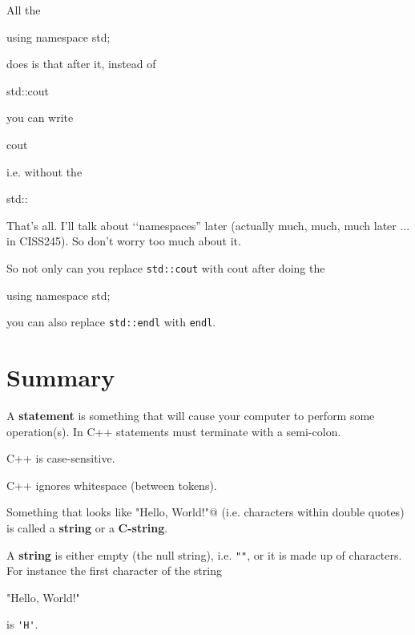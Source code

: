 All the 
\begin{console}[frame=none]

        using namespace std;

\end{console}
does is that after it, instead of
\begin{console}[frame=none]

        std::cout

\end{console}
you can write
\begin{console}[frame=none]

        cout

\end{console}
i.e. without the 
\begin{console}[frame=none]

	std::

\end{console}
That's all. I'll talk about 
\lq\lq namespaces'' later 
(actually much, much, much later ... in CISS245). 
So don't worry too much about it. 




So not only can you replace \verb!std::cout! with cout after doing the 
\begin{console}[frame=none]

    using namespace std;

\end{console}
you can also replace \verb!std::endl! with \verb!endl!.





\newpage\section{Summary}

A \textbf{statement} 
is something that will cause your computer to perform some operation(s). 
In C++ statements must terminate with a semi-colon.

C++ is case-sensitive. 

C++ ignores whitespace (between tokens).

Something that looks like 
\verb@"Hello, World!\n"@ 
(i.e. characters within double quotes) is called a 
\textbf{string} or a 
\textbf{C-string}.

A \textbf{string} is either empty (the null string), 
i.e. \verb!""!, or it is made up of characters. 
For instance the first character of the string
\begin{console}[frame=none]
 
    "Hello, World!\n"

\end{console}
is \verb!'H'!.

